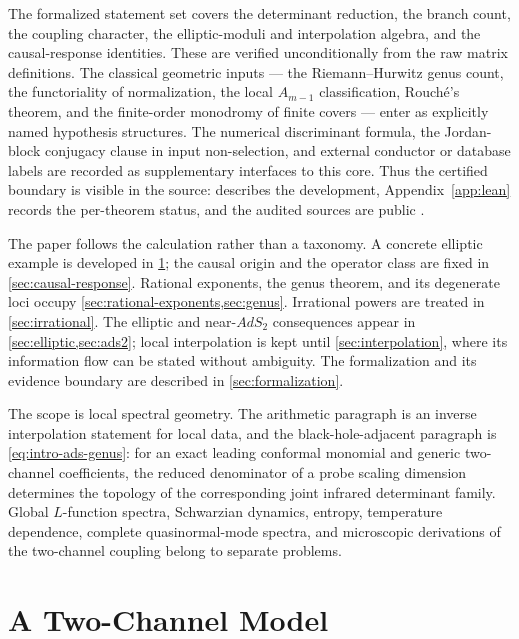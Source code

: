 \documentclass[11pt,reqno]{amsart}
\theoremstyle{remark}
\begin{document}
The formalized statement set covers the determinant reduction, the branch
count, the coupling character, the elliptic-moduli and interpolation
algebra, and the causal-response identities.  These are verified
unconditionally from the raw matrix definitions.  The classical geometric
inputs --- the Riemann--Hurwitz genus count, the functoriality of
normalization, the local $A_{m-1}$ classification, Rouch\'e's theorem, and
the finite-order monodromy of finite covers --- enter as explicitly named
hypothesis structures.  The numerical discriminant formula, the
Jordan-block conjugacy clause in input non-selection, and external
conductor or database labels are recorded as supplementary interfaces to
this core.  Thus the certified boundary is visible in the source:
 describes the development,
Appendix~\ref{app:lean} records the per-theorem status, and the audited
sources are public \cite{leanformalizations}.

The paper follows the calculation rather than a taxonomy.  A concrete
elliptic example is developed in \cref{sec:two-channel}; the causal origin
and the operator class are fixed in \cref{sec:causal-response}.  Rational
exponents, the genus theorem, and its degenerate loci occupy
\cref{sec:rational-exponents,sec:genus}.  Irrational powers are treated in
\cref{sec:irrational}.  The elliptic and near-$AdS_2$ consequences appear in
\cref{sec:elliptic,sec:ads2}; local interpolation is kept until
\cref{sec:interpolation}, where its information flow can be stated without
ambiguity.  The formalization and its evidence boundary are described in
\cref{sec:formalization}.

The scope is local spectral geometry.  The arithmetic paragraph is an
inverse interpolation statement for local data, and the black-hole-adjacent
paragraph is \eqref{eq:intro-ads-genus}: for an exact leading conformal
monomial and generic two-channel coefficients, the reduced denominator of a
probe scaling dimension determines the topology of the corresponding joint
infrared determinant family.  Global $L$-function spectra, Schwarzian
dynamics, entropy, temperature dependence, complete quasinormal-mode
spectra, and microscopic derivations of the two-channel coupling belong to
separate problems.

\section{A Two-Channel Model}\label{sec:two-channel}
\end{document}
